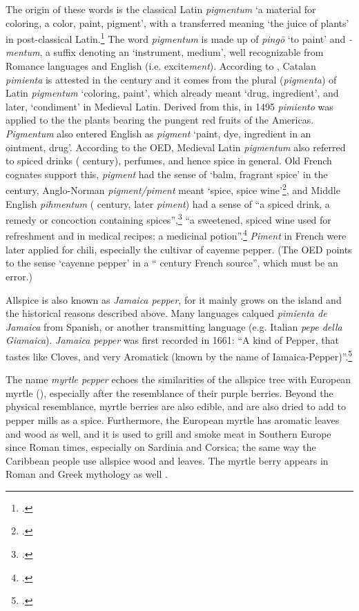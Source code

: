 The origin of these words is the classical Latin \textit{pigmentum} `a material for coloring, a color, paint, pigment', with a transferred meaning `the juice of plants' in post-classical Latin.\footcite[pigmentum ]{lewis_latin_1879} The word \textit{pigmentum} is made up of \textit{pingō} `to paint' and \textit{-mentum}, a suffix denoting an `instrument, medium', well recognizable from Romance languages and English (i.e. excite\textit{ment}).
According to \textcite[459]{corominas_breve_1987}, Catalan \textit{pimienta} is attested in the  century and it comes from the plural (\textit{pigmenta}) of Latin \textit{pigmentum} `coloring, paint', which already meant `drug, ingredient', and later, `condiment' in Medieval Latin. Derived from this, in 1495 \textit{pimiento} was applied to the the plants bearing the pungent red fruits of the Americas. \textit{Pigmentum} also entered English as \textit{pigment} `paint, dye, ingredient in an ointment, drug'. According to the \gls{OED}, Medieval Latin \textit{pigmentum} also referred to spiced drinks ( century), perfumes, and hence spice in general. Old French cognates support this, \textit{pigment} had the sense of `balm, fragrant spice' in the  century, Anglo-Norman \textit{pigment/piment} meant `spice, spice wine'\footcite[pigment]{oed}, and Middle English \textit{pihmentum} ( century, later \textit{piment}) had a sense of ``a spiced drink, a remedy or concoction containing spices'',\footcite[pigment]{oe} ``a sweetened, spiced wine used for refreshment and in medical recipes; a medicinal potion''.\footcite[piment]{med} \textit{Piment} in French were later applied for chili, especially the cultivar of cayenne pepper. (The \gls{OED} points to the sense `cayenne pepper' in a `` century French source'', which must be an error.)


Allspice is also known as  \textit{Jamaica pepper}, for it mainly grows on the island and the historical reasons described above. Many languages calqued \textit{pimienta de Jamaica} from Spanish, or another transmitting language (e.g. Italian \textit{pepe della Giamaica}). \textit{Jamaica pepper} was first recorded in 1661: ``A kind of Pepper, that tastes like Cloves, and very Aromatick (known by the name of Iamaica-Pepper)''.\footcite[Jamaica]{oed}

The name  \textit{myrtle pepper}  echoes the similarities of the allspice tree with European myrtle (), especially after the resemblance of their purple berries. Beyond the physical resemblance, myrtle berries are also edible, and are also dried to add to pepper mills as a spice. Furthermore, the European myrtle has aromatic leaves and wood as well, and it is used to grill and smoke meat in Southern Europe since Roman times, especially on Sardinia and Corsica; the same way the Caribbean people use allspice wood and leaves. The myrtle berry appears in Roman and Greek mythology as well \autocite[186]{van_wyk_culinary_2014}.

